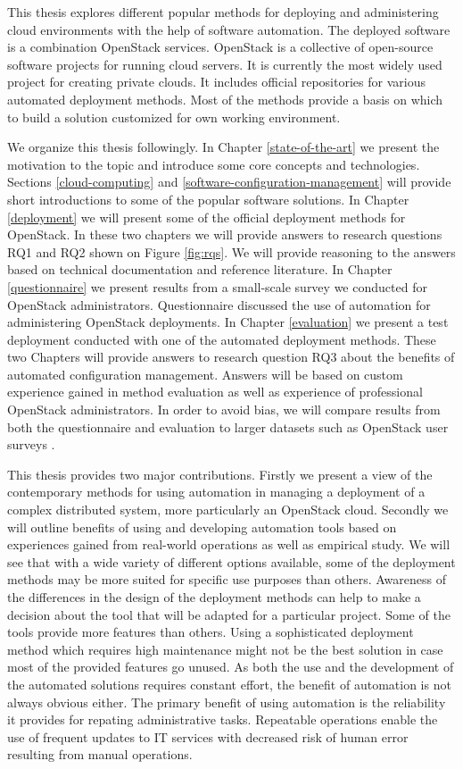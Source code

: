 This thesis explores different popular methods for deploying and administering
cloud environments with the help of software automation. The deployed software
is a combination OpenStack services. OpenStack \cite{sefraoui2012openstack} is
a collective of open-source software projects for running cloud servers. It is
currently the most widely used project for creating private clouds. It includes
official repositories for various automated deployment methods. Most of the
methods provide a basis on which to build a solution customized for own working
environment.

We organize this thesis followingly. In Chapter \ref{state-of-the-art} we
present the motivation to the topic and introduce some core concepts and
technologies. Sections \ref{cloud-computing} and
\ref{software-configuration-management} will provide short introductions to
some of the popular software solutions. In Chapter \ref{deployment} we will
present some of the official deployment methods for OpenStack. In these two
chapters we will provide answers to research questions RQ1 and RQ2 shown on
Figure \ref{fig:rqs}. We will provide reasoning to the answers based on
technical documentation and reference literature. In Chapter
\ref{questionnaire} we present results from a small-scale survey we conducted
for OpenStack administrators. Questionnaire discussed the use of automation for
administering OpenStack deployments. In Chapter \ref{evaluation} we present a
test deployment conducted with one of the automated deployment methods. These
two Chapters will provide answers to research question RQ3 about the benefits
of automated configuration management. Answers will be based on custom
experience gained in method evaluation as well as experience of professional
OpenStack administrators. In order to avoid bias, we will compare results from
both the questionnaire and evaluation to larger datasets such as OpenStack user
surveys \cite{openstack-user-survey-2018}.

This thesis provides two major contributions. Firstly we present a view of the
contemporary methods for using automation in managing a deployment of a complex
distributed system, more particularly an OpenStack cloud. Secondly we will
outline benefits of using and developing automation tools based on experiences
gained from real-world operations as well as empirical study. We will see that
with a wide variety of different options available, some of the deployment
methods may be more suited for specific use purposes than others. Awareness of
the differences in the design of the deployment methods can help to make a
decision about the tool that will be adapted for a particular project. Some of
the tools provide more features than others. Using a sophisticated deployment
method which requires high maintenance might not be the best solution in case
most of the provided features go unused. As both the use and the development of
the automated solutions requires constant effort, the benefit of automation is
not always obvious either. The primary benefit of using automation is the
reliability it provides for repating administrative tasks. Repeatable
operations enable the use of frequent updates to IT services with decreased
risk of human error resulting from manual operations.

